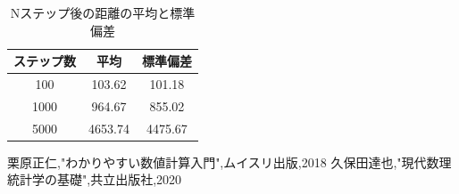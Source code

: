 \documentclass[a4j]{jarticle}
\begin{document}
            \begin{table}[H]
            \caption{Nステップ後の距離の平均と標準偏差}
            \label{meanvar}
            \begin{center}
            \begin{tabular}{c|c|c}\hline
                ステップ数 & 平均 & 標準偏差 \\ \hline \hline
                100 & 103.62 & 101.18 \\
                1000 & 964.67 & 855.02 \\
                5000 & 4653.74 & 4475.67 \\ \hline
            \end{tabular}
            \end{center}
            \end{table}

        \begin{thebibliography}{9}
              栗原正仁,"わかりやすい数値計算入門",ムイスリ出版,2018
              久保田達也,"現代数理統計学の基礎",共立出版社,2020
          \end{thebibliography}
\end{document}
